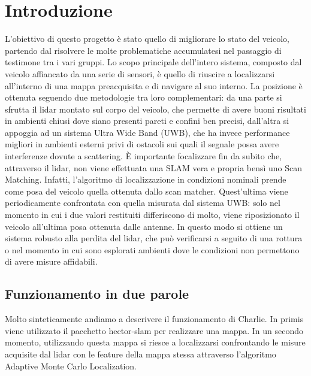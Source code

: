 
\graphicspath{{./figs/}}


	


\newpage\null\thispagestyle{empty}\newpage
\newpage
{}
\setcounter{page}{1}
\tableofcontents
\newpage

%
%


\section*{Introduzione}
L'obiettivo di questo progetto \`e stato quello di migliorare lo stato del veicolo, partendo dal risolvere le molte problematiche accumulatesi nel passaggio di testimone tra i vari gruppi.
Lo scopo principale dell'intero sistema, composto dal veicolo affiancato da una serie di sensori, \`e quello di riuscire a localizzarsi all'interno di una mappa preacquisita e di navigare al suo interno.
La posizione \`e ottenuta seguendo due metodologie tra loro complementari: da una parte si sfrutta il lidar montato sul corpo del veicolo, che permette di avere buoni risultati in ambienti chiusi dove siano presenti pareti e confini ben precisi, dall'altra si appoggia ad un sistema Ultra Wide Band (UWB), che ha invece performance migliori in ambienti esterni privi di ostacoli sui quali il segnale possa avere interferenze dovute a scattering.
\`E importante focalizzare fin da subito che, attraverso il lidar, non viene effettuata una SLAM vera e propria bens\`i uno Scan Matching.
Infatti, l'algoritmo di localizzazione in condizioni nominali prende come posa del veicolo quella ottenuta dallo scan matcher. 
Quest'ultima viene periodicamente confrontata con quella misurata dal sistema UWB: solo nel momento in cui i due valori restituiti differiscono di molto, viene riposizionato il veicolo all'ultima posa ottenuta dalle antenne.
In questo modo si ottiene un sistema robusto alla perdita del lidar, che pu\`o verificarsi a seguito di una rottura o nel momento in cui sono esplorati ambienti dove le condizioni non permettono di avere misure affidabili.

\subsection*{Funzionamento in due parole}
Molto sinteticamente andiamo a descrivere il funzionamento di Charlie. 
In primis viene utilizzato il pacchetto hector-slam per realizzare una mappa. 
In un secondo momento, utilizzando questa mappa si riesce a localizzarsi confrontando le misure acquisite dal lidar con le feature della mappa stessa attraverso l'algoritmo Adaptive Monte Carlo Localization. 

